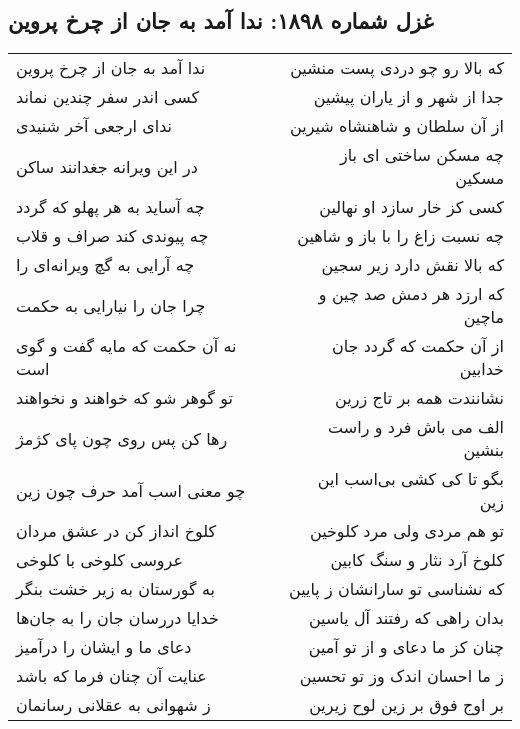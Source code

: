 \begin{center}
\section*{غزل شماره ۱۸۹۸: ندا آمد به جان از چرخ پروین}
\label{sec:1898}
\begin{longtable}{l p{0.5cm} r}
ندا آمد به جان از چرخ پروین
&&
که بالا رو چو دردی پست منشین
\\
کسی اندر سفر چندین نماند
&&
جدا از شهر و از یاران پیشین
\\
ندای ارجعی آخر شنیدی
&&
از آن سلطان و شاهنشاه شیرین
\\
در این ویرانه جغدانند ساکن
&&
چه مسکن ساختی ای باز مسکین
\\
چه آساید به هر پهلو که گردد
&&
کسی کز خار سازد او نهالین
\\
چه پیوندی کند صراف و قلاب
&&
چه نسبت زاغ را با باز و شاهین
\\
چه آرایی به گچ ویرانه‌ای را
&&
که بالا نقش دارد زیر سجین
\\
چرا جان را نیارایی به حکمت
&&
که ارزد هر دمش صد چین و ماچین
\\
نه آن حکمت که مایه گفت و گوی است
&&
از آن حکمت که گردد جان خدابین
\\
تو گوهر شو که خواهند و نخواهند
&&
نشانندت همه بر تاج زرین
\\
رها کن پس روی چون پای کژمژ
&&
الف می باش فرد و راست بنشین
\\
چو معنی اسب آمد حرف چون زین
&&
بگو تا کی کشی بی‌اسب این زین
\\
کلوخ انداز کن در عشق مردان
&&
تو هم مردی ولی مرد کلوخین
\\
عروسی کلوخی با کلوخی
&&
کلوخ آرد نثار و سنگ کابین
\\
به گورستان به زیر خشت بنگر
&&
که نشناسی تو سارانشان ز پایین
\\
خدایا دررسان جان را به جان‌ها
&&
بدان راهی که رفتند آل یاسین
\\
دعای ما و ایشان را درآمیز
&&
چنان کز ما دعای و از تو آمین
\\
عنایت آن چنان فرما که باشد
&&
ز ما احسان اندک وز تو تحسین
\\
ز شهوانی به عقلانی رسانمان
&&
بر اوج فوق بر زین لوح زیرین
\\
\end{longtable}
\end{center}
